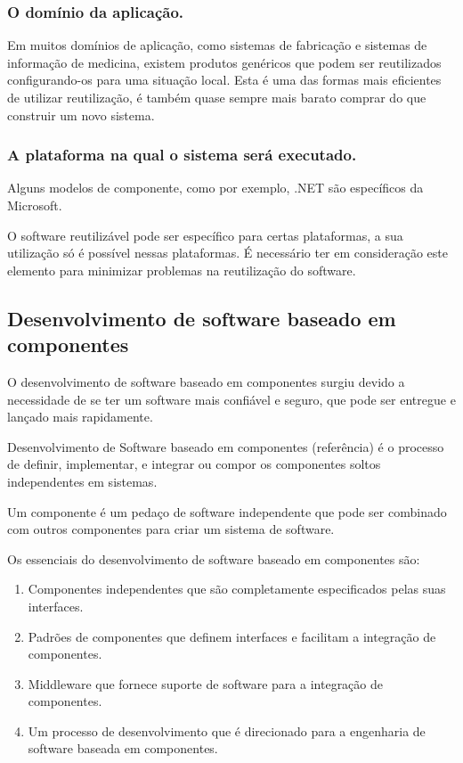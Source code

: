 \documentclass[runningheads]{llncs}
\begin{document}
\subsubsection{O domínio da aplicação.}

Em muitos domínios de aplicação, como sistemas de fabricação e sistemas de informação de medicina, existem produtos genéricos que podem ser reutilizados configurando-os para uma situação local. Esta é uma das formas mais eficientes de utilizar reutilização, é também quase sempre mais barato comprar do que construir um novo sistema. 

\subsubsection{A plataforma na qual o sistema será executado.}

Alguns modelos de componente, como por exemplo, .NET são específicos da Microsoft. \par
O software reutilizável pode ser específico para certas plataformas, a sua utilização só é possível nessas plataformas. É necessário ter em consideração este elemento para minimizar problemas na reutilização do software.


\subsection{Desenvolvimento de software baseado em componentes}

O desenvolvimento de software baseado em componentes surgiu devido a necessidade de se ter um software mais confiável e seguro, que pode ser entregue e lançado mais rapidamente.\par
Desenvolvimento de Software baseado em componentes (referência) é o processo de definir, implementar, e integrar ou compor os componentes soltos independentes em sistemas.\par
Um componente é um pedaço de software independente que pode ser combinado com outros componentes para criar um sistema de software.\par

Os essenciais do desenvolvimento de software baseado em componentes são:
\begin{enumerate}
    \item Componentes independentes que são completamente especificados pelas suas interfaces.
    \item Padrões de componentes que definem interfaces e facilitam a integração de componentes.
    \item Middleware que fornece suporte de software para a integração de componentes.
    \item Um processo de desenvolvimento que é direcionado para a engenharia de software baseada em componentes.
  \end{enumerate}
\end{document}
